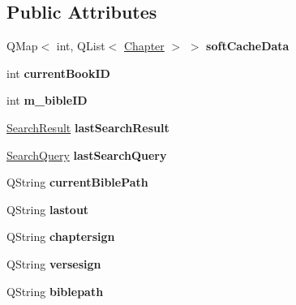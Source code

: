 \subsection*{Public Attributes}
\begin{CompactItemize}
\item 
\hypertarget{classZefaniaBible_afce41b55ffa9b68c427388a3e3c88a1}{
QMap$<$ int, QList$<$ \hyperlink{structChapter}{Chapter} $>$ $>$ \textbf{softCacheData}}
\label{classZefaniaBible_afce41b55ffa9b68c427388a3e3c88a1}

\item 
\hypertarget{classZefaniaBible_711ff81650f4038baee5fa6d54488342}{
int \textbf{currentBookID}}
\label{classZefaniaBible_711ff81650f4038baee5fa6d54488342}

\item 
\hypertarget{classZefaniaBible_9d62818ab51f56352f3f2677f0ab8471}{
int \textbf{m\_\-bibleID}}
\label{classZefaniaBible_9d62818ab51f56352f3f2677f0ab8471}

\item 
\hypertarget{classZefaniaBible_1657a94cbdfb2e48bb953bb5aab5509c}{
\hyperlink{classSearchResult}{SearchResult} \textbf{lastSearchResult}}
\label{classZefaniaBible_1657a94cbdfb2e48bb953bb5aab5509c}

\item 
\hypertarget{classZefaniaBible_90f3e8f2213009fea8b0eab8784f4517}{
\hyperlink{classSearchQuery}{SearchQuery} \textbf{lastSearchQuery}}
\label{classZefaniaBible_90f3e8f2213009fea8b0eab8784f4517}

\item 
\hypertarget{classZefaniaBible_6a443ecbf4641731db5834e62cc6811c}{
QString \textbf{currentBiblePath}}
\label{classZefaniaBible_6a443ecbf4641731db5834e62cc6811c}

\item 
\hypertarget{classZefaniaBible_3a5ba503f30e710b25bc276879e3c7fb}{
QString \textbf{lastout}}
\label{classZefaniaBible_3a5ba503f30e710b25bc276879e3c7fb}

\item 
\hypertarget{classZefaniaBible_be40ae1617e2a9ee8de4af480cfe5c3c}{
QString \textbf{chaptersign}}
\label{classZefaniaBible_be40ae1617e2a9ee8de4af480cfe5c3c}

\item 
\hypertarget{classZefaniaBible_873e160882ea515cbbafb1e98cbe9993}{
QString \textbf{versesign}}
\label{classZefaniaBible_873e160882ea515cbbafb1e98cbe9993}

\item 
\hypertarget{classZefaniaBible_4c2c6e2fc330550328482f7a38f69f71}{
QString \textbf{biblepath}}
\label{classZefaniaBible_4c2c6e2fc330550328482f7a38f69f71}


\end{CompactItemize}
